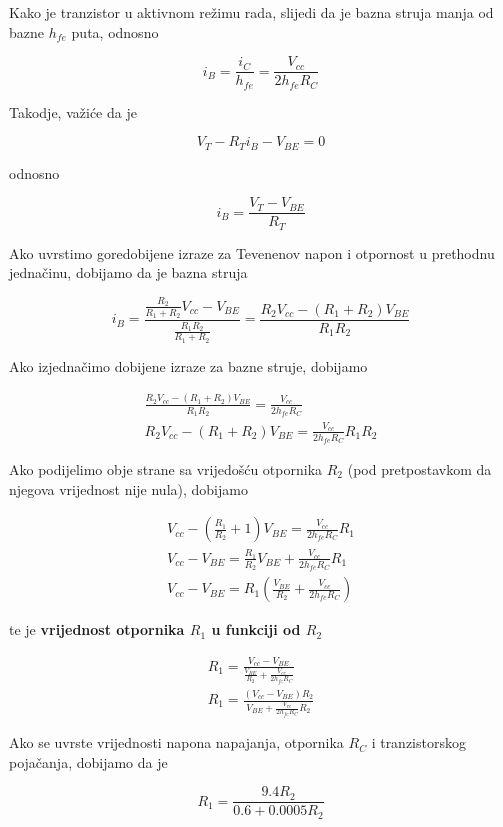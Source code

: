 \documentclass[11pt]{article}
\begin{document}
    Kako je tranzistor u aktivnom režimu rada, slijedi da je bazna struja manja od bazne $h_{fe}$ puta, odnosno
    
    \begin{equation}
        i_B = \frac{i_C}{h_{fe}} = \frac{V_{cc}}{2h_{fe}R_C}
    \end{equation}

    Takodje, važiće da je 

    \begin{equation}
        V_T - R_Ti_B - V_{BE} = 0
    \end{equation}

    odnosno

    \begin{equation}
        i_B = \frac{V_T - V_{BE}}{R_T}
    \end{equation}

    Ako uvrstimo goredobijene izraze za Tevenenov napon i otpornost u prethodnu jednačinu, 
    dobijamo da je bazna struja

    \begin{equation}
        i_B = \frac{\frac{R_2}{R_1 + R_2}V_{cc} - V_{BE}}{\frac{R_1R_2}{R_1 + R_2}} = \frac{R_2V_{cc} - (R_1 + R_2)V_{BE}}{R_1R_2}
    \end{equation}

    Ako izjednačimo dobijene izraze za bazne struje, dobijamo 

    \begin{gather}
        \frac{R_2V_{cc} - (R_1 + R_2)V_{BE}}{R_1R_2} = \frac{V_{cc}}{2h_{fe}R_C} \\
        R_2V_{cc} - (R_1 + R_2)V_{BE} = \frac{V_{cc}}{2h_{fe}R_C}R_1R_2 
    \end{gather}

    Ako podijelimo obje strane sa vrijedošću otpornika $R_2$ (pod pretpostavkom da njegova vrijednost
    nije nula), dobijamo

    \begin{gather}
        V_{cc} - \left(\frac{R_1}{R_2} + 1\right)V_{BE} = \frac{V_{cc}}{2h_{fe}R_C}R_1 \\
        V_{cc} - V_{BE} = \frac{R_1}{R_2}V_{BE} + \frac{V_{cc}}{2h_{fe}R_C}R_1 \\
        V_{cc} - V_{BE} = R_1\left(\frac{V_{BE}}{R_2} + \frac{V_{cc}}{2h_{fe}R_C}\right)
    \end{gather}

    te je \textbf{vrijednost otpornika $R_1$ u funkciji od $R_2$}

    \begin{gather}
        R_1 = \frac{V_{cc} - V_{BE}}{\frac{V_{BE}}{R_2} + \frac{V_{cc}}{2h_{fe}R_C}} \\
        R_1 = \frac{(V_{cc} - V_{BE})R_2}{V_{BE} + \frac{V_{cc}}{2h_{fe}R_C}R_2}
    \end{gather}

    Ako se uvrste vrijednosti napona napajanja, otpornika $R_C$ i tranzistorskog pojačanja, dobijamo
    da je 

    \begin{equation}
        R_1 = \frac{9.4R_2}{0.6 + 0.0005R_2}
    \end{equation}
\end{document}
